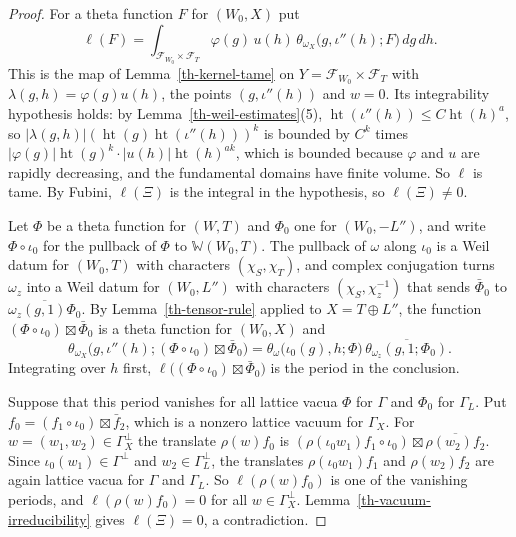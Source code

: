 \begin{proof}
For a theta function $F$ for $(W_0,X)$ put
\[
\ell(F)=\int_{\mathcal F_{W_0}\times\mathcal F_T}\varphi(g)\,u(h)\,
\theta_{\omega_X}\bigl(g,\iota''(h);F\bigr)\,dg\,dh .
\]
This is the map of Lemma~\ref{th-kernel-tame} on
$Y=\mathcal F_{W_0}\times\mathcal F_T$ with $\lambda(g,h)=\varphi(g)u(h)$, the points
$(g,\iota''(h))$ and $w=0$. Its integrability hypothesis holds: by
Lemma~\ref{th-weil-estimates}(5),
$\operatorname{ht}(\iota''(h))\leq C\operatorname{ht}(h)^a$, so
$|\lambda(g,h)|(\operatorname{ht}(g)\operatorname{ht}(\iota''(h)))^k$ is bounded by
$C^k$ times $|\varphi(g)|\operatorname{ht}(g)^k\cdot|u(h)|\operatorname{ht}(h)^{ak}$,
which is bounded because $\varphi$ and $u$ are rapidly decreasing, and the
fundamental domains have finite volume. So $\ell$ is tame. By Fubini,
$\ell(\Xi)$ is the integral in the hypothesis, so $\ell(\Xi)\neq0$.

Let $\Phi$ be a theta function for $(W,T)$ and $\Phi_0$ one for $(W_0,-L'')$,
and write $\Phi\circ\iota_0$ for the pullback of $\Phi$ to $\mathbb W(W_0,T)$.
The pullback of $\omega$ along $\iota_0$ is a Weil datum for $(W_0,T)$ with
characters $(\chi_S,\chi_T)$, and complex conjugation turns $\omega_z$ into a
Weil datum for $(W_0,L'')$ with characters $(\chi_S,\chi_z^{-1})$ that sends
$\bar\Phi_0$ to $\overline{\omega_z(g,1)\Phi_0}$. By
Lemma~\ref{th-tensor-rule} applied to $X=T\oplus L''$, the function
$(\Phi\circ\iota_0)\boxtimes\bar\Phi_0$ is a theta function for $(W_0,X)$ and
\[
\theta_{\omega_X}\bigl(g,\iota''(h);(\Phi\circ\iota_0)\boxtimes\bar\Phi_0\bigr)
=\theta_\omega\bigl(\iota_0(g),h;\Phi\bigr)\,\overline{\theta_{\omega_z}(g,1;\Phi_0)} .
\]
Integrating over $h$ first,
$\ell\bigl((\Phi\circ\iota_0)\boxtimes\bar\Phi_0\bigr)$ is the period in the
conclusion.

Suppose that this period vanishes for all lattice vacua $\Phi$ for $\Gamma$
and $\Phi_0$ for $\Gamma_L$. Put $f_0=(f_1\circ\iota_0)\boxtimes\bar f_2$,
which is a nonzero lattice vacuum for $\Gamma_X$. For
$w=(w_1,w_2)\in\Gamma_X^\perp$ the translate $\rho(w)f_0$ is
$(\rho(\iota_0w_1)f_1\circ\iota_0)\boxtimes\overline{\rho(w_2)f_2}$. Since
$\iota_0(w_1)\in\Gamma^\perp$ and $w_2\in\Gamma_L^\perp$, the translates
$\rho(\iota_0w_1)f_1$ and $\rho(w_2)f_2$ are again lattice vacua for $\Gamma$
and $\Gamma_L$. So $\ell(\rho(w)f_0)$ is one of the vanishing periods, and
$\ell(\rho(w)f_0)=0$ for all $w\in\Gamma_X^\perp$.
Lemma~\ref{th-vacuum-irreducibility} gives $\ell(\Xi)=0$, a contradiction.
\end{proof}

